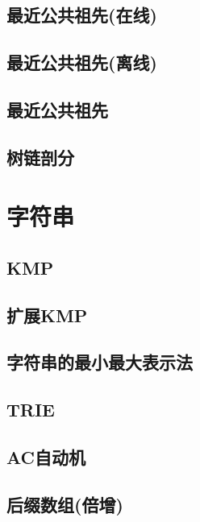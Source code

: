 \section{最近公共祖先(在线)}
\raggedbottom
\hrulefill
\section{最近公共祖先(离线)}
\raggedbottom
\hrulefill
\section{最近公共祖先}
\raggedbottom
\hrulefill
\section{树链剖分}
\raggedbottom
\hrulefill

\chapter{字符串}
\section{KMP}
\raggedbottom
\hrulefill
\section{扩展KMP}
\raggedbottom
\hrulefill
\section{字符串的最小最大表示法}
\raggedbottom
\hrulefill
\section{TRIE}
\raggedbottom
\hrulefill
\section{AC自动机}
\raggedbottom
\hrulefill
\section{后缀数组(倍增)}
\raggedbottom
\hrulefill
